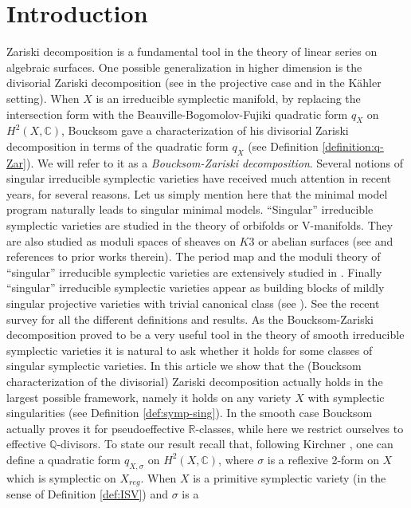\documentclass[12pt,reqno]{amsart}
\theoremstyle{plain}
\theoremstyle{definition}
\begin{document}
\maketitle

\section{Introduction}
Zariski decomposition is a fundamental tool in the theory of linear series on algebraic surfaces. 
One possible generalization in higher dimension is the divisorial Zariski decomposition (see \cite{Nak} in the projective case and \cite{Boucksom1} in the K\"ahler setting).
When $X$ is an irreducible symplectic manifold, by replacing the intersection form with the Beauville-Bogomolov-Fujiki quadratic form $q_X$ on $H^2(X,\mathbb C)$,
Boucksom  \cite[Theorem 4.3 part (i), Proposition 4.4, Theorem 4.8 and Corollary 4.11]{Boucksom1} gave a characterization of his divisorial Zariski decomposition in terms of the quadratic form $q_X$ (see Definition \ref{definition:q-Zar}).  We will refer to it as a {\it Boucksom-Zariski decomposition}.  
Several notions of singular irreducible symplectic varieties have received much attention in recent years, for several reasons. Let us simply mention here that the minimal model program naturally leads to singular minimal models. ``Singular'' irreducible symplectic varieties are studied in the theory of orbifolds or V-manifolds.  They are also studied as moduli spaces of sheaves on $K3$ or abelian surfaces (see \cite{PR} and references to prior works therein). The period map and the moduli theory of ``singular'' irreducible symplectic varieties are extensively studied in \cite{BL1, BL2}.  Finally ``singular'' irreducible symplectic varieties appear as building blocks of mildly singular projective varieties with trivial canonical class (see \cite{HP, Dru18, GGK}).  See the recent survey \cite{Perego} for all the different definitions and results. 
As the Boucksom-Zariski decomposition proved to be a very useful tool in the theory of smooth irreducible symplectic varieties  it is natural to ask whether it holds for some classes
of singular symplectic varieties.
In this article we show  that the (Boucksom characterization of the divisorial) Zariski decomposition actually holds in the largest possible framework, namely it holds on any variety $X$ with symplectic singularities (see Definition \ref{def:symp-sing}). In the smooth case Boucksom actually proves it for pseudoeffective $\mathbb{R}$-classes, while here we restrict ourselves to effective $\mathbb{Q}$-divisors.   To state our result recall that, following Kirchner \cite{Kir}, one can define a quadratic form $q_{X,\sigma}$ on $H^2(X,\mathbb C)$, where $\sigma$ is a reflexive 2-form on $X$ which is symplectic on $X_{reg}$. When $X$ is a primitive symplectic variety (in the sense of Definition \ref{def:ISV}) and $\sigma$ is a 
\end{document}
